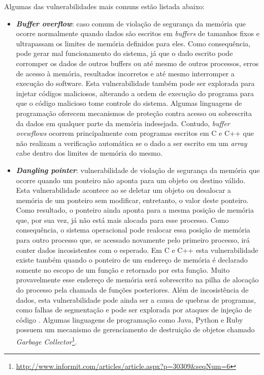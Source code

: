 %

Algumas das vulnerabilidades mais comuns estão listada abaixo:

%

\begin{itemize}
\item \textbf{\emph{Buffer overflow}}: caso comum de violação de segurança da memória que ocorre normalmente quando dados são escritos em \emph{buffers} de tamanhos fixos e ultrapassam os limites de memória definidos para eles. Como consequência, pode gerar mal funcionamento do sistema, já que o dado escrito pode corromper os dados de outros buffers ou até mesmo de outros processos, erros de acesso à memória, resultados incorretos e até mesmo interromper a execução do software. Esta vulnerabilidade também pode ser explorada para injetar códigos maliciosos, alterando a ordem de execução do programa para que o código malicioso tome controle do sistema. Algumas linguagens de programação oferecem mecanismos de proteção contra acesso ou sobrescrita da dados em qualquer parte da memória indesejada. Contudo, \emph{buffer ovewflows} ocorrem principalmente com programas escritos em C e C++ que não realizam a verificação automática se o dado a ser escrito em um \emph{array} cabe dentro dos limites de memória do mesmo.

\item \textbf{\emph{Dangling pointer}}: vulnerabilidade de violação de segurança da memória que ocorre quando um ponteiro não aponta para um objeto ou destino válido. Esta vulnerabilidade acontece ao se deletar um objeto ou desalocar a memória de um ponteiro sem modificar, entretanto, o valor deste ponteiro. Como resultado, o ponteiro ainda aponta para a mesma posição de memória que, por sua vez, já não está mais alocada para esse processo. Como consequência, o sistema operacional pode realocar essa posição de memória para outro processo que, se acessado novamente pelo primeiro processo, irá conter dados incosistentes com o esperado. Em C e C++ esta vulnerabilidade existe também quando o ponteiro de um endereço de memória é declarado somente no escopo de um função e retornado por esta função. Muito provavelmente esse endereço de memória será sobrescrito na pilha de alocação do processo pela chamada de funções posteriores. Além de incosistência de dados, esta vulnerabilidade pode ainda ser a causa de quebras de programas, como falhas de segmentação e pode ser explorada por ataques de injeção de código \cite{afek2007}. Algumas linguagens de programação como Java, Python e Ruby possuem um mecanismo de gerenciamento de destruição de objetos chamado \emph{Garbage Collector}\footnote{\url{http://www.informit.com/articles/article.aspx?p=30309&seqNum=6}}. 


\end{itemize}
